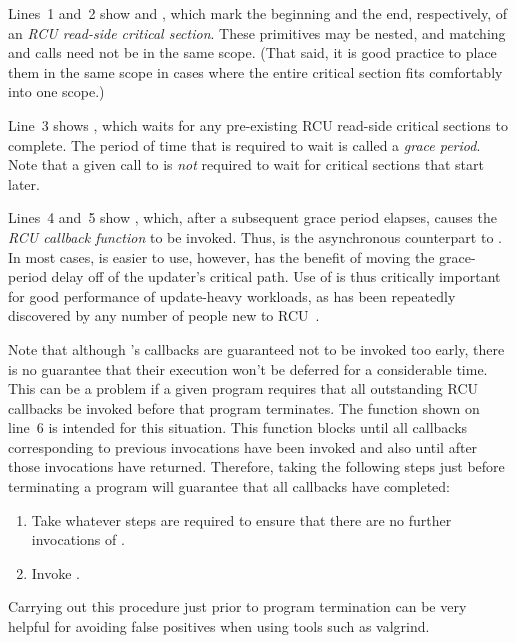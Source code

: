 \documentclass[letterpaper,twocolumn,10pt]{article}
\begin{document}
Lines~1 and~2 show  and ,
which mark the beginning and the end, respectively, of an \emph{RCU read-side
critical section}.
These primitives may be nested, and matching 
and  calls need not be in the same scope.
(That said, it is good practice to place them in the same scope
in cases where the entire critical section fits comfortably into
one scope.)

Line~3 shows , which waits for any pre-existing
RCU read-side critical sections to complete.
The period of time that  is required to wait is
called a \emph{grace period}.
Note that a given call to  is \emph{not} required to
wait for critical sections that start later.

Lines~4 and~5 show , which, after a subsequent grace period
elapses, causes the  \emph{RCU callback function} to be invoked.
Thus,  is the asynchronous counterpart to
.
In most cases,  is easier to use, however, 
has the benefit of moving the grace-period delay off of the updater's
critical path.
Use of  is thus critically important for good performance of
update-heavy workloads, as has been repeatedly discovered by any number of
people new to RCU~\cite{PaulEMcKenney2015ReadMostly}.

Note that although 's callbacks are guaranteed not to be
invoked too early, there is no guarantee that their execution won't be
deferred for a considerable time.
This can be a problem if a given program requires that all outstanding
RCU callbacks be invoked before that program terminates.
The  function shown on line~6 is intended for this
situation.
This function blocks until all callbacks corresponding to previous
 invocations have been invoked and also until after
those invocations have returned.
Therefore, taking the following steps just before terminating a program
will guarantee that all callbacks have completed:

\begin{enumerate}
\item	Take whatever steps are required to ensure that there are no
	further invocations of .
\item	Invoke .
\end{enumerate}

Carrying out this procedure just prior to program termination can be very
helpful for avoiding false positives when using tools such as valgrind.
\end{document}
